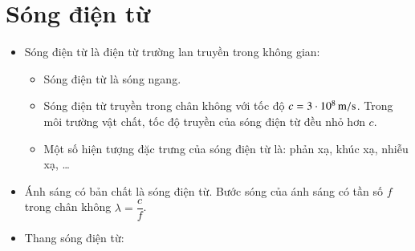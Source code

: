 \section{Sóng điện từ}
\begin{itemize}
	\item Sóng điện từ là điện từ trường lan truyền trong không gian:
	\begin{itemize}
		\item Sóng điện từ là sóng ngang.
		\item Sóng điện từ truyền trong chân không với tốc độ $c=\SI{3E8}{\meter/\second}$. Trong môi trường vật chất, tốc độ truyền của sóng điện từ đều nhỏ hơn $c$.
		\item Một số hiện tượng đặc trưng của sóng điện từ là: phản xạ, khúc xạ, nhiễu xạ, \dots
	\end{itemize}
\item Ánh sáng có bản chất là sóng điện từ. Bước sóng của ánh sáng có tần số $f$ trong chân không $\lambda=\dfrac{c}{f}$.
\item Thang sóng điện từ:
\end{itemize}
